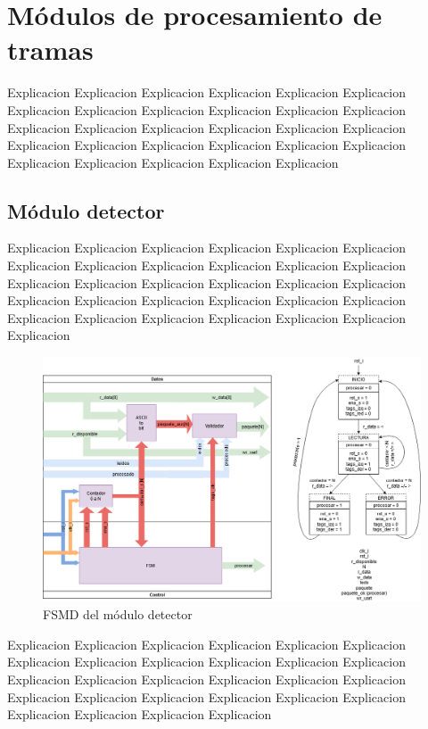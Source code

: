 \section{Módulos de procesamiento de tramas}

	Explicacion Explicacion Explicacion Explicacion Explicacion Explicacion Explicacion Explicacion Explicacion Explicacion Explicacion Explicacion Explicacion Explicacion Explicacion Explicacion Explicacion Explicacion Explicacion Explicacion Explicacion Explicacion Explicacion Explicacion Explicacion Explicacion Explicacion Explicacion Explicacion 
	
	\subsection{Módulo detector}
	
		Explicacion Explicacion Explicacion Explicacion Explicacion Explicacion Explicacion Explicacion Explicacion Explicacion Explicacion Explicacion Explicacion Explicacion Explicacion Explicacion Explicacion Explicacion Explicacion Explicacion Explicacion Explicacion Explicacion Explicacion Explicacion Explicacion Explicacion Explicacion Explicacion Explicacion Explicacion 
		
		\begin{figure}[h]
		\centering
			\includegraphics[scale=.4]{./Figures/FSMD-Detector}
			\caption{FSMD del módulo detector}
			\label{fig:FSMD_Detector}
		\end{figure}
		
		Explicacion Explicacion Explicacion Explicacion Explicacion Explicacion Explicacion Explicacion Explicacion Explicacion Explicacion Explicacion Explicacion Explicacion Explicacion Explicacion Explicacion Explicacion Explicacion Explicacion Explicacion Explicacion Explicacion Explicacion Explicacion Explicacion Explicacion Explicacion 
		
